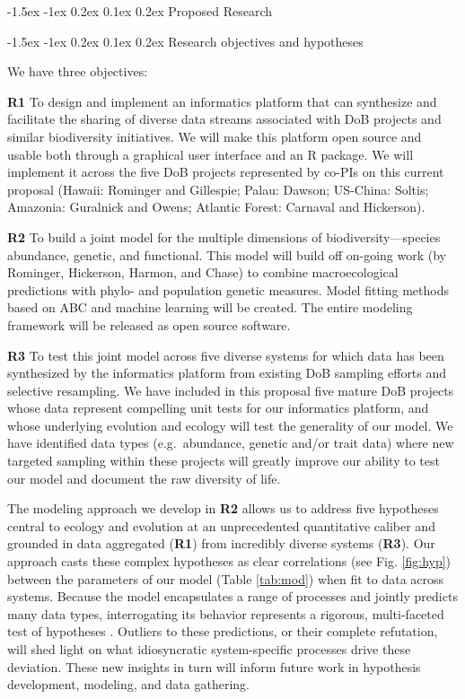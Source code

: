 \documentclass[11pt]{article}
\makeatletter
\renewcommand\section{\@startsection{section}{1}{\z@}%
                                  {-1.5ex \@plus -1ex \@minus 0.2ex}%
                                  {0.1ex \@plus 0.2ex}%
                                  {\normalfont\Large\bfseries}}
\renewcommand\subsection{\@startsection{subsection}{1}{\z@}%
                                  {-1.5ex \@plus -1ex \@minus 0.2ex}%
                                  {0.1ex \@plus 0.2ex}%
                                  {\normalfont\large\bfseries}}
\makeatother
\begin{document}
\section{Proposed Research}\label{proposed-research}

\subsection{Research objectives and
hypotheses}\label{research-objectives-and-hypotheses}

We have three objectives:

\textbf{R1} To design and implement an informatics platform that can
synthesize and facilitate the sharing of diverse data streams associated
with DoB projects and similar biodiversity initiatives. We will make
this platform open source and usable both through a graphical user
interface and an R \cite{R_Development_Core2013-ze} package. We will
implement it across the five DoB projects represented by co-PIs on this
current proposal (Hawaii: Rominger and Gillespie; Palau: Dawson;
US-China: Soltis; Amazonia: Guralnick and Owens; Atlantic Forest:
Carnaval and Hickerson).

\textbf{R2} To build a joint model for the multiple dimensions of
biodiversity---species abundance, genetic, and functional. This model
will build off on-going work (by Rominger, Hickerson, Harmon, and Chase)
to combine macroecological predictions with phylo- and population
genetic measures. Model fitting methods based on ABC and machine
learning will be created. The entire modeling framework will be released
as open source software.

\textbf{R3} To test this joint model across five diverse systems for
which data has been synthesized by the informatics platform from
existing DoB sampling efforts and selective resampling. We have included
in this proposal five mature DoB projects whose data represent
compelling unit tests for our informatics platform, and whose underlying
evolution and ecology will test the generality of our model. We have
identified data types (e.g.~abundance, genetic and/or trait data) where
new targeted sampling within these projects will greatly improve our
ability to test our model and document the raw diversity of life.

The modeling approach we develop in \textbf{R2} allows us to address
five hypotheses central to ecology and evolution at an unprecedented
quantitative caliber and grounded in data aggregated (\textbf{R1}) from
incredibly diverse systems (\textbf{R3}). Our approach casts these
complex hypotheses as clear correlations (see Fig. \ref{fig:hyp})
between the parameters of our model (Table \ref{tab:mod}) when fit to
data across systems. Because the model encapsulates a range of processes
and jointly predicts many data types, interrogating its behavior
represents a rigorous, multi-faceted test of hypotheses
\cite{McGill2003-sf,McGill2007-zd,Leibold2017-jv}. Outliers to these
predictions, or their complete refutation, will shed light on what
idiosyncratic system-specific processes drive these deviation. These
new insights in turn will inform future work in hypothesis
development, modeling, and data gathering.
\end{document}
